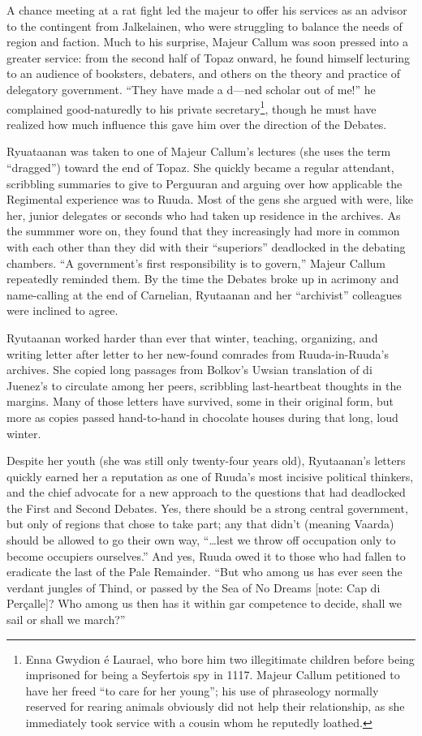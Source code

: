 \documentclass[12pt]{report}
\begin{document}
A chance meeting at a rat fight led the majeur to offer his services
as an advisor to the contingent from Jalkelainen, who were struggling
to balance the needs of region and faction.  Much to his surprise,
Majeur Callum was soon pressed into a greater service: from the second
half of Topaz onward, he found himself lecturing to an audience of
booksters, debaters, and others on the theory and practice of
delegatory government.  ``They have made a d---ned scholar out of me!''
he complained good-naturedly to his private secretary\footnote{Enna
Gwydion \'{e} Laurael, who bore him two illegitimate children before
being imprisoned for being a Seyfertois spy in 1117.  Majeur Callum
petitioned to have her freed ``to care for her young''; his use of
phraseology normally reserved for rearing animals obviously did not
help their relationship, as she immediately took service with a cousin
whom he reputedly loathed.}, though he must have realized how much
influence this gave him over the direction of the Debates.

Ryuataanan was taken to one of Majeur Callum's lectures (she uses the
term ``dragged'') toward the end of Topaz.  She quickly became a regular
attendant, scribbling summaries to give to Perguuran and arguing over
how applicable the Regimental experience was to Ruuda.  Most of the
gens she argued with were, like her, junior delegates or seconds who
had taken up residence in the archives.  As the summmer wore on, they
found that they increasingly had more in common with each other than
they did with their ``superiors'' deadlocked in the debating chambers.
``A government's first responsibility is to govern,'' Majeur Callum
repeatedly reminded them.  By the time the Debates broke up in
acrimony and name-calling at the end of Carnelian, Ryutaanan and her
``archivist'' colleagues were inclined to agree.

Ryutaanan worked harder than ever that winter, teaching, organizing,
and writing letter after letter to her new-found comrades from
Ruuda-in-Ruuda's archives.  She copied long passages from Bolkov's
Uwsian translation of di Juenez's  to circulate among her peers, scribbling last-heartbeat thoughts
in the margins.  Many of those letters have survived, some in their
original form, but more as copies passed hand-to-hand in chocolate
houses during that long, loud winter.

Despite her youth (she was still only twenty-four years old),
Ryutaanan's letters quickly earned her a reputation as one of Ruuda's
most incisive political thinkers, and the chief advocate for a new
approach to the questions that had deadlocked the First and Second
Debates.  Yes, there should be a strong central government, but only
of regions that chose to take part; any that didn't (meaning Vaarda)
should be allowed to go their own way, ``{\ldots}lest we throw off
occupation only to become occupiers ourselves.''  And yes, Ruuda owed
it to those who had fallen to eradicate the last of the Pale
Remainder.  ``But who among us has ever seen the verdant jungles of
Thind, or passed by the Sea of No Dreams [note: Cap di Per\c{c}alle]?
Who among us then has it within gar competence to decide, shall we
sail or shall we march?''
\end{document}
